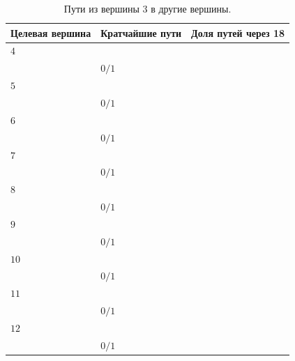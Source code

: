 \documentclass[12pt, a4paper]{extarticle}
\begin{document}
\begin{table}[h!]
    \caption{Пути из вершины $3$ в другие вершины.}
    \label{tbl:10-3}
    \begin{tabularx}{\textwidth}{|X|X|X|}
        \hline 
        Целевая вершина & Кратчайшие пути & Доля путей через 18 \\
        \hline 
        $4$ & \begin{tabular}{@{}l@{}} $[3, 6, 4]$ \\ \end{tabular} & $0/1$ \\
        \hline
        $5$ & \begin{tabular}{@{}l@{}} $[3, 6, 5]$ \\ \end{tabular} & $0/1$ \\
        \hline
        $6$ & \begin{tabular}{@{}l@{}} $[3, 6]$ \\ \end{tabular} & $0/1$ \\
        \hline
        $7$ & \begin{tabular}{@{}l@{}} $[3, 7]$ \\ \end{tabular} & $0/1$ \\
        \hline
        $8$ & \begin{tabular}{@{}l@{}} $[3, 7, 8]$ \\ \end{tabular} & $0/1$ \\
        \hline
        $9$ & \begin{tabular}{@{}l@{}} $[3, 9]$ \\ \end{tabular} & $0/1$ \\
        \hline
        $10$ & \begin{tabular}{@{}l@{}} $[3, 6, 10]$ \\ \end{tabular} & $0/1$ \\
        \hline
        $11$ & \begin{tabular}{@{}l@{}} $[3, 6, 10, 11]$ \\ \end{tabular} & $0/1$ \\
        \hline
        $12$ & \begin{tabular}{@{}l@{}} $[3, 9, 13, 12]$ \\ \end{tabular} & $0/1$ \\

\end{tabularx}
\end{table}
\end{document}
